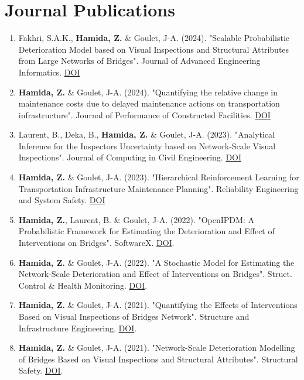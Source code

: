 \documentclass[10pt]{article}
\begin{document}
\section{Journal Publications}
\begin{enumerate}
\item Fakhri, S.A.K., \textbf{Hamida, Z.} \& Goulet, J-A. (2024). "Scalable Probabilistic Deterioration Model based on Visual Inspections and Structural Attributes from Large Networks of Bridges". Journal of Advanced Engineering Informatics. \href{https://doi.org/10.1016/j.aei.2024.103035}{DOI}

\item \textbf{Hamida, Z.} \& Goulet, J-A. (2024). "Quantifying the relative change in maintenance costs due to delayed maintenance actions on transportation infrastructure". Journal of Performance of Constructed Facilities. \href{https://doi.org/10.1061/JPCFEV/CFENG-4802}{DOI}

\item Laurent, B., Deka, B., \textbf{Hamida, Z.} \& Goulet, J-A. (2023). "Analytical Inference for the Inspectors Uncertainty based on Network-Scale Visual Inspections". Journal of Computing in Civil Engineering.  \href{https://doi.org/10.1061/JCCEE5.CPENG-5333}{DOI}

\item \textbf{Hamida, Z.} \& Goulet, J-A. (2023). "Hierarchical Reinforcement Learning for Transportation Infrastructure Maintenance Planning". Reliability Engineering and System Safety. \href{https://doi.org/10.1016/j.ress.2023.109214}{DOI}

\item \textbf{Hamida, Z.}, Laurent, B. \& Goulet, J-A. (2022). "OpenIPDM: A Probabilistic Framework for Estimating the Deterioration and Effect of Interventions on Bridges". SoftwareX. \href{https://doi.org/10.1016/j.softx.2022.101077}{DOI}.
\item \textbf{Hamida, Z.} \& Goulet, J-A. (2022). "A Stochastic Model for Estimating the Network-Scale Deterioration and Effect of Interventions on Bridges". Struct. Control \& Health Monitoring. \href{http://dx.doi.org/10.1002/stc.2916}{DOI}.
\item \textbf{Hamida, Z.} \& Goulet, J-A. (2021). "Quantifying the Effects of Interventions Based on Visual Inspections of Bridges Network". Structure and Infrastructure Engineering.
\href{http://dx.doi.org/10.1080/15732479.2021.1919149}{DOI}.

\item \textbf{Hamida, Z.} \& Goulet, J-A. (2021). "Network-Scale Deterioration Modelling of Bridges Based on Visual Inspections and Structural Attributes". Structural Safety.
\href{https://doi.org/10.1016/j.strusafe.2020.102024}{DOI}.


\end{enumerate}
\end{document}
